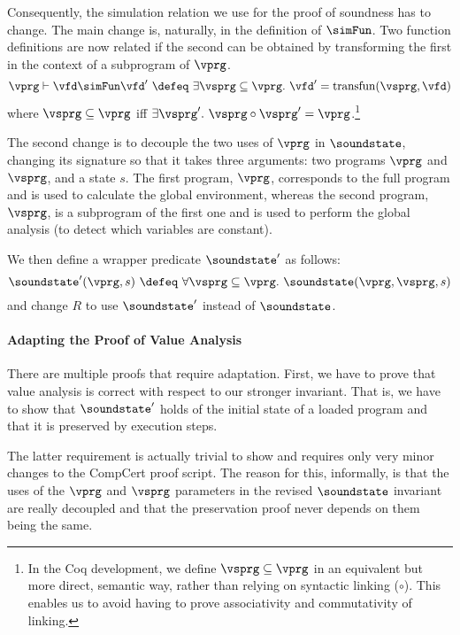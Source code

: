 Consequently, the simulation relation we use for the proof of soundness has to change.
The main change is, naturally, in the definition of $\simFun$.
Two function definitions are now related if the second can be obtained by transforming the first in the context of a subprogram of $\vprg$.
\[ 
\vprg \vdash \vfd \simFun \vfd' ~\defeq~ \exists \vsprg \subseteq \vprg.~ \vfd' = \mathrm{transfun}(\vsprg,\vfd)
\]
where $\vsprg \subseteq \vprg$ iff $\exists \vsprg'.~\vsprg \circ
\vsprg' = \vprg$.\footnote{In the Coq development, we define $\vsprg
  \subseteq \vprg$ in an equivalent but more direct, semantic way,
  rather than relying on syntactic linking ($\circ$).  This enables us
  to avoid having to prove associativity and commutativity of
  linking.}

The second change is to decouple the two uses of $\vprg$ in $\soundstate$,
changing its signature so that it takes three arguments: two programs $\vprg$ and $\vsprg$, and a state $s$.
The first program, $\vprg$, corresponds to the full program and is used to calculate the global environment,
whereas the second program, $\vsprg$, is a subprogram of the first one and is used to perform the global analysis
(\ie to detect which variables are constant). 

We then define a wrapper predicate $\soundstate'$ as follows:
\[
\soundstate'(\vprg,s) ~\defeq~ 
  \forall \vsprg \subseteq \vprg.~ \soundstate(\vprg,\vsprg,s)
\]
and change $R$ to use $\soundstate'$ instead of $\soundstate$.


\paragraph{Adapting the Proof of Value Analysis}

There are multiple proofs that require adaptation.
First, we have to prove that value analysis is correct with respect to our stronger invariant.
That is, we have to show that $\soundstate'$ holds of the initial state of a loaded program and that it is preserved by execution steps.

The latter requirement is actually trivial to show and requires only
very minor changes to the CompCert proof script.  The reason for this,
informally, is that the uses of the $\vprg$ and $\vsprg$ parameters in
the revised $\soundstate$ invariant are really decoupled and that the
preservation proof never depends on them being the same.

